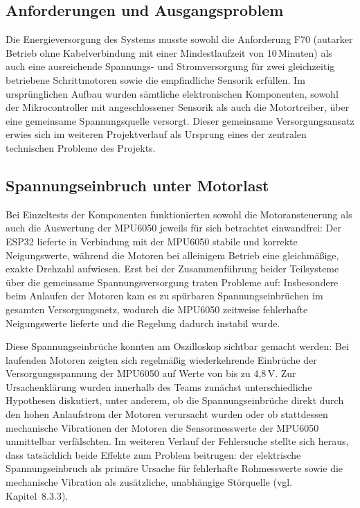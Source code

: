\documentclass[12pt,ngerman,numbers=noenddot,abstracton,headsepline]{scrreprt}
\begin{document}
\subsection{Anforderungen und Ausgangsproblem}
\label{subsec:energie_anforderungen}

Die Energieversorgung des Systems musste sowohl die Anforderung F70 (autarker Betrieb ohne Kabelverbindung mit einer Mindestlaufzeit von 10\,Minuten) als auch eine ausreichende Spannungs- und Stromversorgung für zwei gleichzeitig betriebene Schrittmotoren sowie die empfindliche Sensorik erfüllen. Im ursprünglichen Aufbau wurden sämtliche elektronischen Komponenten, sowohl der Mikrocontroller mit angeschlossener Sensorik als auch die Motortreiber, über eine gemeinsame Spannungsquelle versorgt. Dieser gemeinsame Versorgungsansatz erwies sich im weiteren Projektverlauf als Ursprung eines der zentralen technischen Probleme des Projekts.

\subsection{Spannungseinbruch unter Motorlast}
\label{subsec:spannungseinbruch}

Bei Einzeltests der Komponenten funktionierten sowohl die Motoransteuerung als auch die Auswertung der MPU6050 jeweils für sich betrachtet einwandfrei: Der ESP32 lieferte in Verbindung mit der MPU6050 stabile und korrekte Neigungswerte, während die Motoren bei alleinigem Betrieb eine gleichmäßige, exakte Drehzahl aufwiesen. Erst bei der Zusammenführung beider Teilsysteme über die gemeinsame Spannungsversorgung traten Probleme auf: Insbesondere beim Anlaufen der Motoren kam es zu spürbaren Spannungseinbrüchen im gesamten Versorgungsnetz, wodurch die MPU6050 zeitweise fehlerhafte Neigungswerte lieferte und die Regelung dadurch instabil wurde.

Diese Spannungseinbrüche konnten am Oszilloskop sichtbar gemacht werden: Bei laufenden Motoren zeigten sich regelmäßig wiederkehrende Einbrüche der Versorgungsspannung der MPU6050 auf Werte von bis zu 4,8\,V. Zur Ursachenklärung wurden innerhalb des Teams zunächst unterschiedliche Hypothesen diskutiert, unter anderem, ob die Spannungseinbrüche direkt durch den hohen Anlaufstrom der Motoren verursacht wurden oder ob stattdessen mechanische Vibrationen der Motoren die Sensormesswerte der MPU6050 unmittelbar verfälschten. Im weiteren Verlauf der Fehlersuche stellte sich heraus, dass tatsächlich beide Effekte zum Problem beitrugen: der elektrische Spannungseinbruch als primäre Ursache für fehlerhafte Rohmesswerte sowie die mechanische Vibration als zusätzliche, unabhängige Störquelle (vgl. Kapitel~8.3.3).
\end{document}
